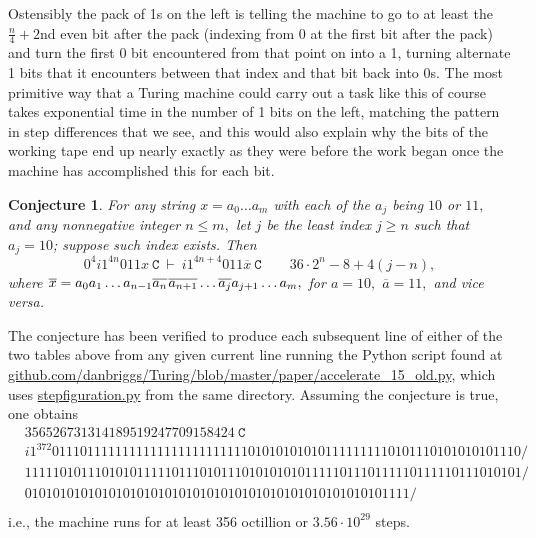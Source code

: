 \documentclass[12pt]{article}
\newtheorem*{conjecture}{Conjecture}
\begin{document}
Ostensibly the pack of 1s on the left is telling the machine to go to at least the $\frac n4+2$nd even bit after the pack
(indexing from 0 at the first bit after the pack) and turn the first 0 bit encountered from that point on into a 1,
turning alternate 1 bits that it encounters between that index and that bit back into 0s. The most primitive way that
a Turing machine could carry out a task like this of course takes exponential time in the number of 1 bits on the left,
matching the pattern in step differences that we see, and this would also explain why the bits of the working tape end up
nearly exactly as they were before the work began once the machine has accomplished this for each bit. 

\newpage

\begin{conjecture}
For any string $x=a_0\ldots a_m$
with each of the $a_j$ being $10$ or $11,$
and any nonnegative integer $n\leq m,$
let $j$ be the least index $j\geq n$ such that $a_j=10$;
suppose such index exists.
Then
$$0^4 i1^{4n}011x~\texttt{C}~\vdash~
i1^{4n+4}011\overline x~\texttt{C}\quad\quad36\cdot2^n-8+4(j-n),$$
where $\overline x = 
a_0a_1\ldots a_{n-1}\overline{a_{n}}\hspace{.08883em}\overline{a_{n+1}}\ldots\overline{a_j}
a_{j+1}\ldots a_m,$ for $a=10,$ $\overline a=11,$ and vice versa.
\end{conjecture}

The conjecture has been verified to produce each subsequent line of either of the two tables above
from any given current line running the Python script found at 
\href{https://github.com/danbriggs/Turing/blob/master/paper/accelerate\_15\_old.py}
{github.com/danbriggs/Turing/blob/master/paper/accelerate\_15\_old.py},
which uses
\href{https://github.com/danbriggs/Turing/blob/master/paper/stepfiguration.py}{stepfiguration.py}
from the same directory. Assuming the conjecture is true,
one obtains
\begin{align*}
&356526731314189519247709158424~\texttt{C}\\
&i1^{372}0111011111111111111111111111010101010101111111110101110101010101110/\\
&11111010111010101111101110101110101010101111101110111110111110111010101/\\
&0101010101010101010101010101010101010101010101010101111/\\
\end{align*}
i.e., the machine runs for at least 356 octillion or $3.56\cdot10^{29}$ steps.
\end{document}
